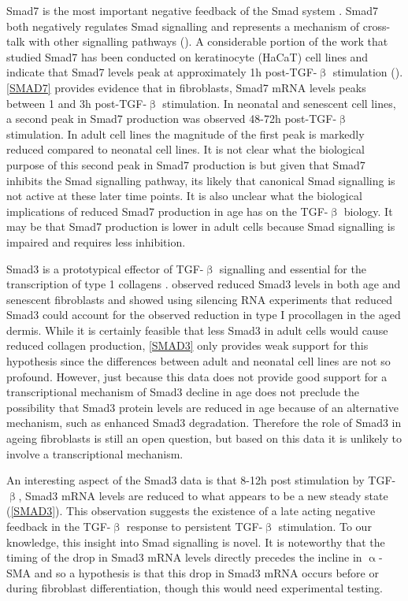 \documentclass[alpha-refs]{wiley-article}
\newcommand{\tgf}{TGF-$\upbeta$}
\newcommand{\sma}{$\upalpha$-SMA}
\begin{document}
Smad7 is the most important negative feedback of the Smad system \citep{Hayashi1997, Nakao1997, Yan2016, Gersdorff2000, Ebisawa2001, Hanyu2001, Pulaski2001, Suzuki2002, Shi2004, Zhang2007}. Smad7 both negatively regulates Smad signalling and represents a mechanism of cross-talk with other signalling pathways (\cite{Yan2011}). A considerable portion of the work that studied Smad7 has been conducted on keratinocyte (HaCaT) cell lines and indicate that Smad7 levels peak at approximately 1h post-\tgf{} stimulation (\cite{Denissova2000}). \cref{SMAD7} provides evidence that in fibroblasts, Smad7 mRNA levels peaks between 1 and 3h post-\tgf{} stimulation. In neonatal and senescent cell lines, a second peak in Smad7 production was observed 48-72h post-\tgf{} stimulation. In adult cell lines the magnitude of the first peak is markedly reduced compared to neonatal cell lines. It is not clear what the biological purpose of this second peak in Smad7 production is but given that Smad7 inhibits the Smad signalling pathway, its likely that canonical Smad signalling is not active at these later time points. It is also unclear what the biological implications of reduced Smad7 production in age has on the \tgf{} biology. It may be that Smad7 production is lower in adult cells because Smad signalling is impaired and requires less inhibition. 

Smad3 is a prototypical effector of \tgf{} signalling and essential for the transcription of type 1 collagens \cite{Runyan2003}. \cite{Purohit2016} observed reduced Smad3 levels in both age and senescent fibroblasts and showed using silencing RNA experiments that reduced Smad3 could account for the observed reduction in type I procollagen in the aged dermis. While it is certainly feasible that less Smad3 in adult cells would cause reduced collagen production, \cref{SMAD3} only provides weak support for this hypothesis since the differences between adult and neonatal cell lines are not so profound. However, just because this data does not provide good support for a transcriptional mechanism of Smad3 decline in age does not preclude the possibility that Smad3 protein levels are reduced in age because of an alternative mechanism, such as enhanced Smad3 degradation. Therefore the role of Smad3 in ageing fibroblasts is still an open question, but based on this data it is unlikely to involve a transcriptional mechanism. 

An interesting aspect of the Smad3 data is that 8-12h post stimulation by \tgf{}, Smad3 mRNA levels are reduced to what appears to be a new steady state (\cref{SMAD3}). This observation suggests the existence of a late acting negative feedback in the \tgf{} response to persistent \tgf{} stimulation. To our knowledge, this insight into Smad signalling is novel. It is noteworthy that the timing of the drop in Smad3 mRNA levels directly precedes the incline in \sma{} and so a hypothesis is that this drop in Smad3 mRNA occurs before or during fibroblast differentiation, though this would need experimental testing. 
\end{document}
